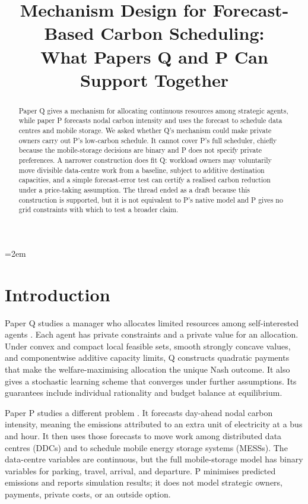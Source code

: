 \documentclass{article}
\title{Mechanism Design for Forecast-Based Carbon Scheduling:\\What Papers Q and P Can Support Together}
\author{}
\date{}
\begin{document}
\emergencystretch=2em
\maketitle

\begin{abstract}
Paper Q gives a mechanism for allocating continuous resources among strategic agents, while paper P forecasts nodal carbon intensity and uses the forecast to schedule data centres and mobile storage.  We asked whether Q's mechanism could make private owners carry out P's low-carbon schedule.  It cannot cover P's full scheduler, chiefly because the mobile-storage decisions are binary and P does not specify private preferences.  A narrower construction does fit Q: workload owners may voluntarily move divisible data-centre work from a baseline, subject to additive destination capacities, and a simple forecast-error test can certify a realised carbon reduction under a price-taking assumption.  The thread ended as a draft because this construction is supported, but it is not equivalent to P's native model and P gives no grid constraints with which to test a broader claim.
\end{abstract}

\section{Introduction}

Paper Q studies a manager who allocates limited resources among self-interested agents \cite{garjani2026}.  Each agent has private constraints and a private value for an allocation.  Under convex and compact local feasible sets, smooth strongly concave values, and componentwise additive capacity limits, Q constructs quadratic payments that make the welfare-maximising allocation the unique Nash outcome.  It also gives a stochastic learning scheme that converges under further assumptions.  Its guarantees include individual rationality and budget balance at equilibrium.

Paper P studies a different problem \cite{cai2026}.  It forecasts day-ahead nodal carbon intensity, meaning the emissions attributed to an extra unit of electricity at a bus and hour.  It then uses those forecasts to move work among distributed data centres (DDCs) and to schedule mobile energy storage systems (MESSs).  The data-centre variables are continuous, but the full mobile-storage model has binary variables for parking, travel, arrival, and departure.  P minimises predicted emissions and reports simulation results; it does not model strategic owners, payments, private costs, or an outside option.
\end{document}
